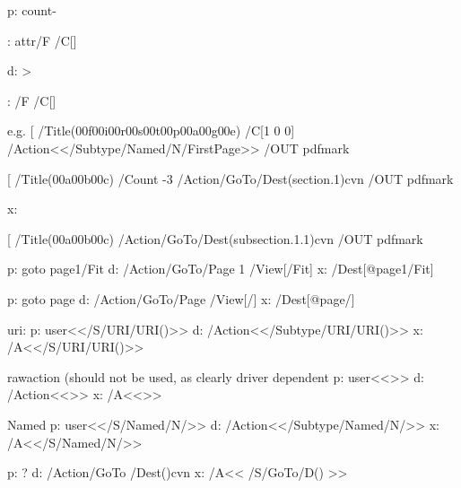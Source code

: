  p: \pdfoutline\BKM@attr\BKM@action
                count\ifBKM@DO@open\else-\fi\BKM@x@childs
                {\BKM@DO@title}%
                
   \BKM@attr: attr{/F \BKM@DO@flags /C[\BKM@DO@color]}              

d:  \BKM@write{[}%
    \ifnum\BKM@x@childs>\z@
    \fi
    \ifx\BKM@attr\@empty
    \else
      \BKM@write{\BKM@attr}%
    \fi
    \BKM@write{\BKM@action}%
    
  \BKM@attr: /F \BKM@DO@flags /C[\BKM@DO@color]
    
e.g. 
[ /Title(\000f\000i\000r\000s\000t\000p\000a\000g\000e)
/C[1 0 0]
/Action<</Subtype/Named/N/FirstPage>>
/OUT pdfmark 

[
/Title(\000a\000b\000c)
/Count -3
/Action/GoTo/Dest(section.1)cvn
/OUT pdfmark

   
 x: %

[
/Title(\000a\000b\000c)
/Action/GoTo/Dest(subsection.1.1)cvn
/OUT pdfmark


p: goto page1{/Fit}
d: /Action/GoTo/Page 1 /View[/Fit]%
x: /Dest[@page1/Fit]

p: goto page\BKM@DO@page{/\BKM@DO@view} 
d: /Action/GoTo/Page \BKM@DO@page/View[/\BKM@DO@view]
x: /Dest[@page\BKM@page/\BKM@view]

uri:
p: user{<</S/URI/URI(\BKM@DO@uri)>>}
d: /Action<</Subtype/URI/URI(\BKM@DO@uri)>>%
x:  /A<</S/URI/URI(\BKM@uri)>>%

rawaction (should not be used, as clearly driver dependent
p:  user{<<\BKM@DO@rawaction>>}%
d:  /Action<<\BKM@DO@rawaction>>
x: /A<<\BKM@rawaction>>

Named
p: user{<</S/Named/N/\BKM@DO@named>>}
d: /Action<</Subtype/Named/N/\BKM@DO@named>>%
x: /A<</S/Named/N/\BKM@named>>%

p: \BKM@DefGotoNameAction\BKM@action\BKM@DO@dest ?
d: /Action/GoTo /Dest(\BKM@DO@dest)cvn%
x: /A<< /S/GoTo/D(\BKM@dest) >>%

